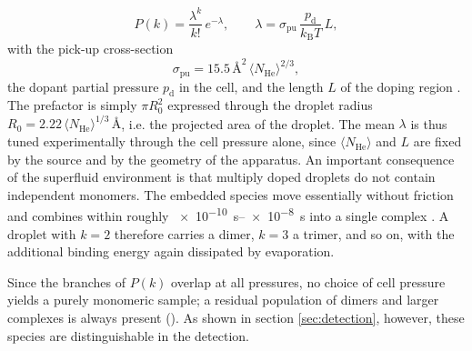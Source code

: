 \begin{equation}
P(k) = \frac{\lambda^k}{k!}\,e^{-\lambda},
\qquad
\lambda = \sigma_\mathrm{pu}\,\frac{p_\mathrm{d}}{k_\mathrm{B}T}\,L ,
\end{equation}
with the pick-up cross-section
\begin{equation}
\sigma_\mathrm{pu} = 15.5\,\si{\angstrom\squared} \,\langle N_\mathrm{He}\rangle^{2/3},
\end{equation}
the dopant partial pressure $p_\mathrm{d}$ in the cell, and the length $L$ of the doping region \cite{ianThesis,toenniesSpectroscopyAtomsMolecules1998}. The prefactor is simply $\pi R_0^2$ expressed through the droplet radius $R_0 = 2.22\,\langle N_\mathrm{He}\rangle^{1/3}\,\si{\angstrom}$, i.e. the projected area of the droplet. The mean $\lambda$ is thus tuned experimentally through the cell pressure alone, since $\langle N_\mathrm{He}\rangle$ and $L$ are fixed by the source and by the geometry of the apparatus.
An important consequence of the superfluid environment is that multiply doped droplets do not contain independent monomers. The embedded species move essentially without friction and combines within roughly \SIrange{e-10}{e-8}{\second} into a single complex \cite{toenniesSuperfluidHeliumDroplets2004a}. A droplet with $k = 2$ therefore carries a dimer, $k = 3$ a trimer, and so on, with the additional binding energy again dissipated by evaporation.

Since the branches of $P(k)$ overlap at all pressures, no choice of cell pressure yields a purely monomeric sample; a residual population of dimers and larger complexes is always present (). As shown in section \ref{sec:detection}, however, these species are distinguishable in the detection.


